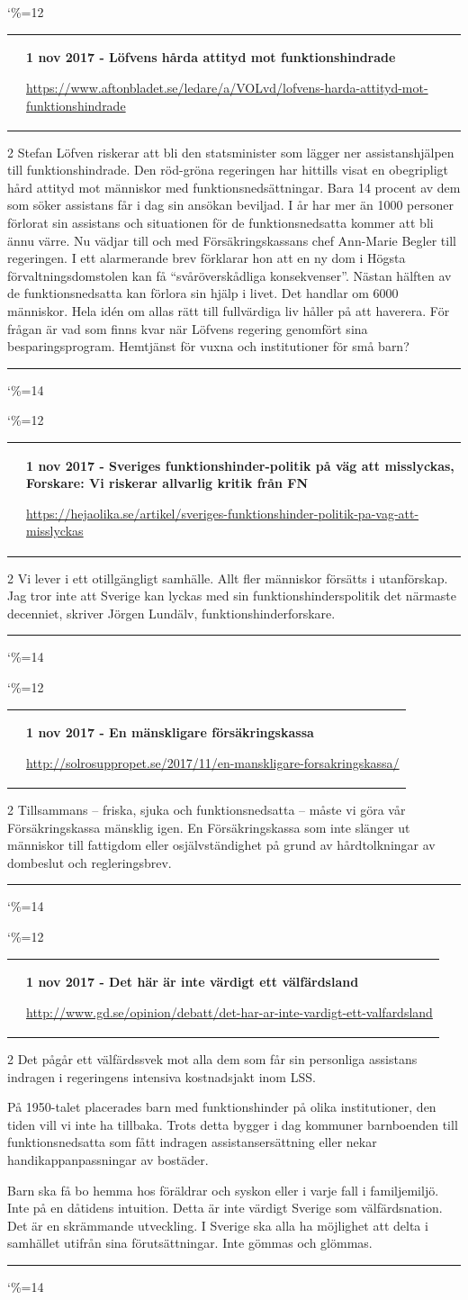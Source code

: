 \documentclass[a4paper]{article}
\makeatletter
\newcommand{\entry}{
\catcode`\%=12
\@entry}
\newcommand{\@entry}[4][]{
\bigskip
\begin{tabular*}{\textwidth}{l m{\textwidth-4cm}}
\qrcode{#4} & \textbf{#2}

\medskip

\url{#4}

\end{tabular*}

\medskip


\begin{multicols}{2}
#3
\end{multicols}

#1

\medskip
\hrule

\catcode`\%=14
}
\makeatother
\begin{document}
{{{{\entry{1 nov 2017 - Löfvens hårda attityd mot funktionshindrade}{Stefan Löfven riskerar att bli den statsminister som lägger ner assistanshjälpen till funktionshindrade. Den röd-gröna regeringen har hittills visat en obegripligt hård attityd mot människor med funktionsnedsättningar.
Bara 14 procent av dem som söker assistans får i dag sin ansökan beviljad. I år har mer än 1000 personer förlorat sin assistans och situationen för de funktionsnedsatta kommer att bli ännu värre. Nu vädjar till och med Försäkringskassans chef Ann-Marie Begler till regeringen. I ett alarmerande brev förklarar hon att en ny dom i Högsta förvaltningsdomstolen kan få “svåröverskådliga konsekvenser”. Nästan hälften av de funktionsnedsatta kan förlora sin hjälp i livet. Det handlar om 6000 människor.
Hela idén om allas rätt till fullvärdiga liv håller på att haverera. För frågan är vad som finns kvar när Löfvens regering genomfört sina besparingsprogram. Hemtjänst för vuxna och institutioner för små barn?}{https://www.aftonbladet.se/ledare/a/VOLvd/lofvens-harda-attityd-mot-funktionshindrade}

\entry{1 nov 2017 - Sveriges funktionshinder-politik på väg att misslyckas, Forskare: Vi riskerar allvarlig kritik från FN}{Vi lever i ett otillgängligt samhälle. Allt fler människor försätts i utanförskap. Jag tror inte att Sverige kan lyckas med sin funktionshinderspolitik det närmaste decenniet, skriver Jörgen Lundälv, funktionshinderforskare.}{https://hejaolika.se/artikel/sveriges-funktionshinder-politik-pa-vag-att-misslyckas}

\entry{1 nov 2017 - En mänskligare försäkringskassa}{Tillsammans – friska, sjuka och funktionsnedsatta – måste vi göra vår Försäkringskassa mänsklig igen. En Försäkringskassa som inte slänger ut människor till fattigdom eller osjälvständighet på grund av hårdtolkningar av dombeslut och regleringsbrev.}{http://solrosuppropet.se/2017/11/en-manskligare-forsakringskassa/}

\entry{1 nov 2017 - Det här är inte värdigt ett välfärdsland}{Det pågår ett välfärdssvek mot alla dem som får sin personliga assistans indragen i regeringens intensiva kostnadsjakt inom LSS.

På 1950-talet placerades barn med funktionshinder på olika institutioner, den tiden vill vi inte ha tillbaka. Trots detta bygger i dag kommuner barnboenden till funktionsnedsatta som fått indragen assistansersättning eller nekar handikappanpassningar av bostäder.

Barn ska få bo hemma hos föräldrar och syskon eller i varje fall i familjemiljö. Inte på en dåtidens intuition. Detta är inte värdigt Sverige som välfärdsnation. Det är en skrämmande utveckling. I Sverige ska alla ha möjlighet att delta i samhället utifrån sina förutsättningar. Inte gömmas och glömmas.}{http://www.gd.se/opinion/debatt/det-har-ar-inte-vardigt-ett-valfardsland}


}}}}
\end{document}
